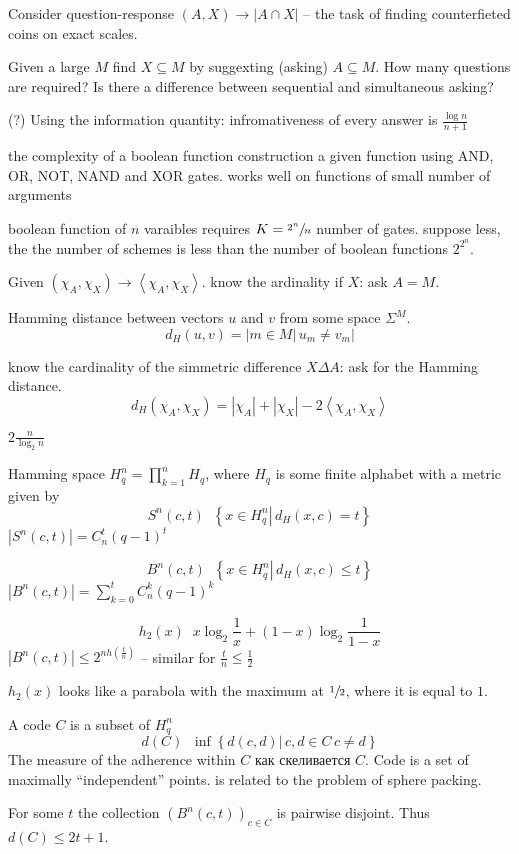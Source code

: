 \documentclass[a4paper]{article}
\newcommand{\obj}[1]{{\left\{ #1 \right \}}}
\newcommand{\brac}[1]{{\left ( #1 \right )}}
\newcommand{\induc}[1]{{\left . #1 \right \vert}}
\newcommand{\abs}[1]{{\left | #1 \right |}}
\newcommand{\brkt}[1]{{\left\langle #1 \right\rangle}}
\newcommand{\defn}{\mathop{\overset{\Delta}{=}}\nolimits}
\newcommand{\rus}[1]{\foreignlanguage{russian}{#1}}
\begin{document}
Consider question-response $(A,X)\to \abs{A\cap X}$
-- the task of finding counterfieted coins on exact scales.

Given a large $M$ find $X\subseteq M$ by suggexting (asking) $A\subseteq M$.
How many questions are required?
Is there a difference between sequential and simultaneous asking?

(?) Using the information quantity:
infromativeness of every answer is $\frac{\log n}{n+1}$

the complexity of a boolean function
construction a given function using AND, OR, NOT, NAND and XOR gates.
works well on functions of small number of arguments

boolean function of $n$ varaibles requires $K=\sfrac{2^n}{n}$ number of gates.
suppose less, the the number of schemes is less than the number of boolean functions $2^{2^n}$.

Given $(\chi_A,\chi_X)\to \brkt{\chi_A,\chi_X}$.
know the ardinality if $X$: ask $A=M$.

Hamming distance between vectors $u$ and $v$ from some space $\Sigma^M$.
\[d_H\brac{u,v} = \abs{\induc{m\in M}\, u_m \neq v_m} \]

know the cardinality of the simmetric difference $X\Delta A$:
ask for the Hamming distance.
\[d_H(\chi_A,\chi_X) = \abs{\chi_A}+\abs{\chi_X}-2\brkt{\chi_A,\chi_X}\]

$2\frac{n}{\log_2 n}$

Hamming space
$H_q^n = \prod_{k=1}^n H_q$, where $H_q$ is some finite alphabet with a metric given by 
\[S^n(c,t)\defn \obj{\induc{x\in H_q^n}\, d_H(x,c)=t}\]
$\abs{S^n(c,t)} = C^t_n \brac{q-1}^t$

\[B^n(c,t)\defn \obj{\induc{x\in H_q^n}\, d_H(x,c)\leq t}\]
$\abs{B^n(c,t)} = \sum_{k=0}^t C^k_n \brac{q-1}^k$

\[h_2(x) \defn x\log_2{\frac{1}{x}} + (1-x)\log_2{\frac{1}{1-x}}\]
$\abs{B^n(c,t)}\leq 2^{n h\brac{\frac{t}{n}}}$ -- similar for $\frac{t}{n}\leq \frac{1}{2}$

$h_2(x)$ looks like a parabola with the maximum at $\sfrac{1}{2}$, where it is equal to $1$.

A code $C$ is a subset of $H_q^n$ 
\[d(C) \defn \inf\obj{\induc{d(c,d)}\,c,d\in C\, c\neq d}\]
The measure of the adherence within $C$ \rus{как скеливается $C$}.
Code is a set of maximally ``independent'' points. is related to the problem of sphere packing.

For some $t$ the collection $\brac{B^n(c,t)}_{c\in C}$ is pairwise disjoint. Thus $d(C)\leq 2t+1$.
\end{document}
